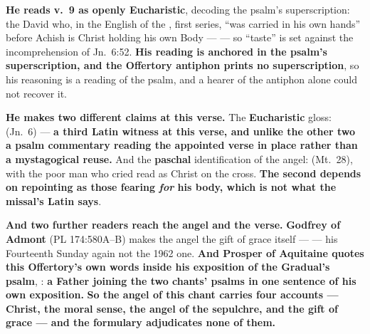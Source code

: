 \begin{witnessnote}
\textbf{He reads v.~9 as openly Eucharistic},
decoding the psalm's superscription: the David who, in the English of the
, first series, ``was carried in his own
hands'' before Achish is Christ holding his own Body --- 
--- so ``taste'' is set against the incomprehension of Jn.\ 6:52. \textbf{His
reading is anchored in the
psalm's superscription, and the Offertory antiphon prints no superscription}, so
his reasoning is a reading of the psalm, and a hearer of the antiphon alone
could not recover it.
\end{witnessnote}

\begin{witnessnote}
 \textbf{He makes two different claims at this verse.} The \textbf{Eucharistic} gloss:
 (Jn.~6)
--- \textbf{a third Latin witness at this verse, and unlike the other two a
psalm commentary reading the appointed verse in place rather than a
mystagogical reuse.} And the \textbf{paschal} identification of the angel:
 (Mt.~28), with the poor man who cried read as Christ on the cross.
\textbf{The second depends on repointing  as those fearing \emph{for} his body, which is not what the missal's Latin
says}.
\end{witnessnote}

\textbf{And two further readers reach the angel and the verse.}
\textbf{Godfrey of Admont} (PL 174:580A--B) makes the angel the gift of grace
itself ---  --- his Fourteenth Sunday again not the 1962 one.
\textbf{And Prosper of Aquitaine quotes this Offertory's own words inside his
exposition of the Gradual's psalm}, : \textbf{a Father joining the two chants' psalms in one sentence
of his own exposition.} \textbf{So
the angel of this chant carries four accounts --- Christ, the moral sense,
the angel of the sepulchre, and the gift of grace --- and the formulary
adjudicates none of them.}

